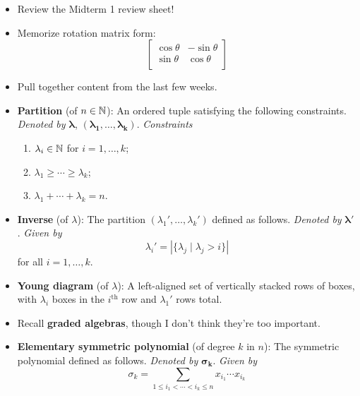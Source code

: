 \documentclass[../notes.tex]{subfiles}
\begin{document}
\begin{itemize}
\begin{proof}[Answer]
\begin{table}[h!]
            \caption{Character table for $Q_8$.}
            \label{tab:charTableQ8}
        \end{table}
    \end{proof}
    \item Review the Midterm 1 review sheet!
    \item Memorize rotation matrix form:
    \begin{equation*}
        \begin{bmatrix}
            \cos\theta & -\sin\theta\\
            \sin\theta & \cos\theta\\
        \end{bmatrix}
    \end{equation*}
    \item Pull together content from the last few weeks.
    \item \textbf{Partition} (of $n\in\mathbb{N}$): An ordered tuple satisfying the following constraints. \emph{Denoted by} $\bm{\lambda}$, $\bm{(\lambda_1,\ldots,\lambda_k)}$. \emph{Constraints}
    \begin{enumerate}
        \item $\lambda_i\in\mathbb{N}$ for $i=1,\dots,k$;
        \item $\lambda_1\geq\cdots\geq\lambda_k$;
        \item $\lambda_1+\cdots+\lambda_k=n$.
    \end{enumerate}
    \item \textbf{Inverse} (of $\lambda$): The partition $(\lambda_1',\dots,\lambda_k')$ defined as follows. \emph{Denoted by} $\bm{\lambda'}$. \emph{Given by}
    \begin{equation*}
        \lambda_i' = |\{\lambda_j\mid\lambda_j>i\}|
    \end{equation*}
    for all $i=1,\dots,k$.
    \item \textbf{Young diagram} (of $\lambda$): A left-aligned set of vertically stacked rows of boxes, with $\lambda_i$ boxes in the $i^\text{th}$ row and $\lambda_1'$ rows total.
    \item Recall \textbf{graded algebras}, though I don't think they're too important.
    \item \textbf{Elementary symmetric polynomial} (of degree $k$ in $n$): The symmetric polynomial defined as follows. \emph{Denoted by} $\bm{\sigma_k}$. \emph{Given by}
    \begin{equation*}
        \sigma_k = \sum_{1\leq i_1<\cdots<i_k\leq n}x_{i_1}\cdots x_{i_k}
    \end{equation*}

\end{itemize}
\end{document}
